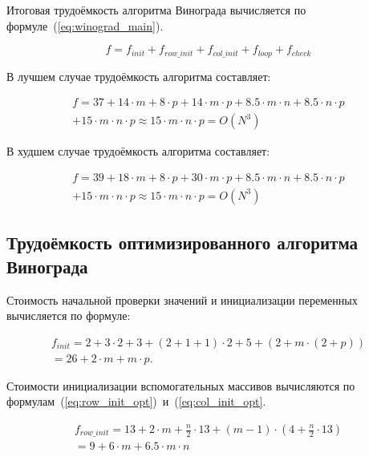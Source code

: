 Итоговая трудоёмкость алгоритма Винограда вычисляется по формуле~(\ref{eq:winograd_main}).

\begin{equation}
    \label{eq:winograd_main}
    f = f_{init} + f_{row\_init} + f_{col\_init} + f_{loop} + f_{check}
\end{equation}

В лучшем случае трудоёмкость алгоритма составляет:

\begin{equation}
    \begin{gathered}
        f = 37 + 14 \cdot m +  8 \cdot p + 14 \cdot m \cdot p 
        + 8.5 \cdot m \cdot n + 8.5 \cdot n \cdot p \\
        + 15 \cdot m \cdot n \cdot p \approx 15 \cdot m \cdot n \cdot p = O(N^3)
    \end{gathered}
\end{equation}

В худшем случае трудоёмкость алгоритма составляет:

\begin{equation}
    \begin{gathered}
        f = 39 + 18 \cdot m +  8 \cdot p + 30 \cdot m \cdot p 
        + 8.5 \cdot m \cdot n + 8.5 \cdot n \cdot p \\
        + 15 \cdot m \cdot n \cdot p \approx 15 \cdot m \cdot n \cdot p = O(N^3)
    \end{gathered}
\end{equation}

\subsection{Трудоёмкость оптимизированного алгоритма Винограда}

Стоимость начальной проверки значений и инициализации переменных вычисляется по формуле:

\begin{equation}
    \begin{gathered}
        f_{init} = 2 + 3 \cdot 2 + 3 + (2 + 1 + 1) \cdot 2 + 5 + (2 + m \cdot (2 + p)) \\
        = 26 + 2 \cdot m + m \cdot p.
    \end{gathered} 
\end{equation}

Стоимости инициализации вспомогательных массивов вычисляются по формулам~(\ref{eq:row_init_opt})~и~(\ref{eq:col_init_opt}.

\begin{equation}
    \label{eq:row_init_opt}
    \begin{gathered}
        f_{row\_init} = 13 + 2 \cdot m + \frac{n}{2} \cdot 13 + (m-1)\cdot(4 + \frac{n}{2}\cdot 13) \\ = 9 + 6 \cdot m + 6.5 \cdot m \cdot n
    \end{gathered} 
\end{equation}

